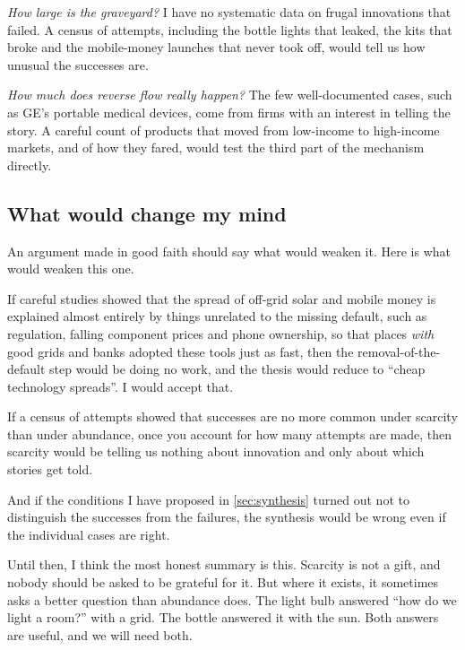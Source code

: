 \emph{How large is the graveyard?} I have no systematic data on frugal
innovations that failed. A census of attempts, including the bottle lights
that leaked, the kits that broke and the mobile-money launches that never
took off, would tell us how unusual the successes are.

\emph{How much does reverse flow really happen?} The few well-documented
cases, such as GE's portable medical devices, come from firms with an
interest in telling the story. A careful count of products that moved from
low-income to high-income markets, and of how they fared, would test the third
part of the mechanism directly.

\subsection{What would change my mind}

An argument made in good faith should say what would weaken it. Here is what
would weaken this one.

If careful studies showed that the spread of off-grid solar and mobile money
is explained almost entirely by things unrelated to the missing default,
such as regulation, falling component prices and phone ownership, so that
places \emph{with} good grids and banks adopted these tools just as fast, then
the removal-of-the-default step would be doing no work, and the thesis would
reduce to ``cheap technology spreads''. I would accept that.

If a census of attempts showed that successes are no more common under
scarcity than under abundance, once you account for how many attempts are made,
then scarcity would be telling us nothing about innovation and only about
which stories get told.

And if the conditions I have proposed in \cref{sec:synthesis} turned out not
to distinguish the successes from the failures, the synthesis would be
wrong even if the individual cases are right.

Until then, I think the most honest summary is this. Scarcity is not a gift,
and nobody should be asked to be grateful for it. But where it exists, it
sometimes asks a better question than abundance does. The light bulb answered
``how do we light a room?'' with a grid. The bottle answered it with the sun.
Both answers are useful, and we will need both.
